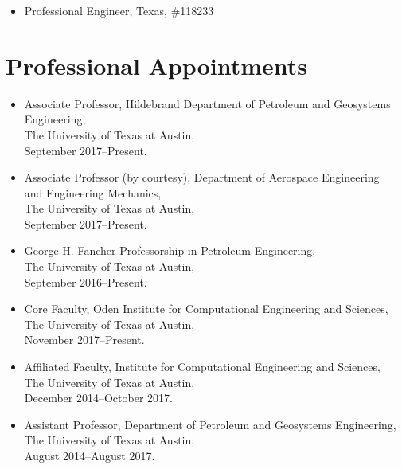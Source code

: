 \begin{itemize}
    \item Professional Engineer, Texas, \#118233
\end{itemize}


\ifdefined\ispdf
\section*{Professional Appointments}

\begin{itemize}
    \item Associate Professor, Hildebrand Department of Petroleum and Geosystems Engineering, \\ 
          The University of Texas at Austin, \\
          September 2017--Present. 

    \item Associate Professor (by courtesy), Department of Aerospace Engineering \\ 
          and Engineering Mechanics, \\ 
          The University of Texas at Austin, \\
          September 2017--Present. 

    \item George H. Fancher Professorship in Petroleum Engineering, \\ 
          The University of Texas at Austin, \\
          September 2016--Present. 

    \item Core Faculty, Oden Institute for Computational Engineering and Sciences, \\ 
          The University of Texas at Austin, \\
          November 2017--Present. 

    \item Affiliated Faculty, Institute for Computational Engineering and Sciences, \\ 
          The University of Texas at Austin, \\
          December 2014--October 2017. 

    \item Assistant Professor, Department of Petroleum and Geosystems Engineering, \\ 
          The University of Texas at Austin, \\
          August 2014--August 2017. 


\end{itemize}
